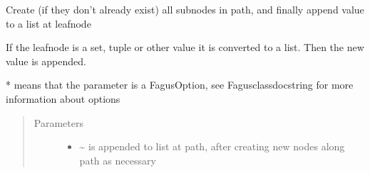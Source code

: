 \documentclass[a4paper,10pt,english]{sphinxmanual}
\begin{document}
\begin{fulllineitems}
\begin{fulllineitems}
\label{\detokenize{fagus.fagus:fagus.fagus.Fagus.append}}
\pysigstartsignatures
{}
\pysigstopsignatures
\sphinxAtStartPar
Create (if they don’t already exist) all sub\sphinxhyphen{}nodes in path, and finally append value to a list at leaf\sphinxhyphen{}node

\sphinxAtStartPar
If the leaf\sphinxhyphen{}node is a set, tuple or other value it is converted to a list. Then the new value is appended.

\sphinxAtStartPar
* means that the parameter is a FagusOption, see Fagus\sphinxhyphen{}class\sphinxhyphen{}docstring for more information about options
\begin{quote}\begin{description}
\item[{Parameters}] \leavevmode\begin{itemize}
\item {}
\sphinxAtStartPar
{} \textendash{} \textasciitilde{} is appended to list at path, after creating new nodes along path as necessary


\end{itemize}
\end{description}
\end{quote}
\end{fulllineitems}
\end{fulllineitems}
\end{document}
